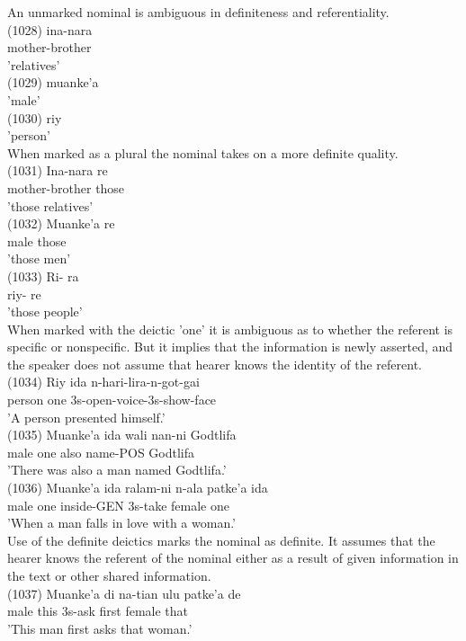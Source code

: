 \documentclass[10pt]{article}
\begin{document}
An unmarked nominal is ambiguous in definiteness and referentiality.\\
(1028) ina-nara\\
mother-brother\\
'relatives'\\
(1029) muanke'a\\
'male'\\
(1030) riy\\
'person'\\
When marked as a plural the nominal takes on a more definite quality.\\
(1031) Ina-nara re\\
mother-brother those\\
'those relatives'\\
(1032) Muanke'a re\\
male those\\
'those men'\\
(1033) Ri- ra\\
riy- re\\
'those people'\\
When marked with the deictic 'one' it is ambiguous as to whether the referent is specific or nonspecific. But it implies that the information is newly asserted, and the speaker does not assume that hearer knows the identity of the referent.\\
(1034) Riy ida n-hari-lira-n-got-gai\\
person one 3s-open-voice-3s-show-face\\
'A person presented himself.'\\
(1035) Muanke'a ida wali nan-ni Godtlifa\\
male one also name-POS Godtlifa\\
'There was also a man named Godtlifa.'\\
(1036) Muanke'a ida ralam-ni n-ala patke'a ida\\
male one inside-GEN 3s-take female one\\
'When a man falls in love with a woman.'\\
Use of the definite deictics marks the nominal as definite. It assumes that the hearer knows the referent of the nominal either as a result of given information in the text or other shared information.\\
(1037) Muanke'a di na-tian ulu patke'a de\\
male this 3s-ask first female that\\
'This man first asks that woman.'\\
\end{document}
